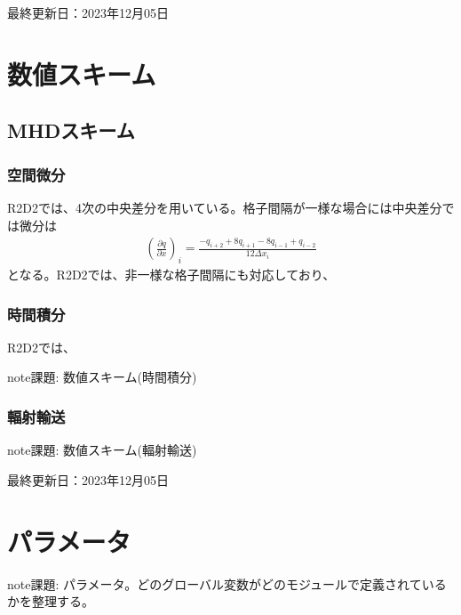 \documentclass[letterpaper,10pt,dvipdfmx,report]{sphinxmanual}
\begin{document}
\sphinxAtStartPar
最終更新日：2023年12月05日

\sphinxstepscope


\chapter{数値スキーム}
\label{\detokenize{scheme:id1}}\label{\detokenize{scheme::doc}}

\section{MHDスキーム}
\label{\detokenize{scheme:mhd}}

\subsection{空間微分}
\label{\detokenize{scheme:id2}}
\sphinxAtStartPar
R2D2では、4次の中央差分を用いている。格子間隔が一様な場合には中央差分では微分は
\begin{equation*}
\begin{split}\left(\frac{\partial q}{\partial x}\right)_i =\frac{-q_{i+2}+8q_{i+1}-8q_{i-1}+q_{i-2}}{12\Delta x_i}\end{split}
\end{equation*}
\sphinxAtStartPar
となる。R2D2では、非一様な格子間隔にも対応しており、


\subsection{時間積分}
\label{\detokenize{scheme:id3}}
\sphinxAtStartPar
R2D2では、

\begin{sphinxadmonition}{note}{\label{\detokenize{scheme:id4}}課題:}
\sphinxAtStartPar
数値スキーム(時間積分)
\end{sphinxadmonition}


\subsection{輻射輸送}
\label{\detokenize{scheme:id5}}
\begin{sphinxadmonition}{note}{\label{\detokenize{scheme:id6}}課題:}
\sphinxAtStartPar
数値スキーム(輻射輸送)
\end{sphinxadmonition}

\sphinxAtStartPar
最終更新日：2023年12月05日

\sphinxstepscope


\chapter{パラメータ}
\label{\detokenize{parameter:id1}}\label{\detokenize{parameter::doc}}
\begin{sphinxadmonition}{note}{\label{\detokenize{parameter:id2}}課題:}
\sphinxAtStartPar
パラメータ。どのグローバル変数がどのモジュールで定義されているかを整理する。
\end{sphinxadmonition}
\end{document}
